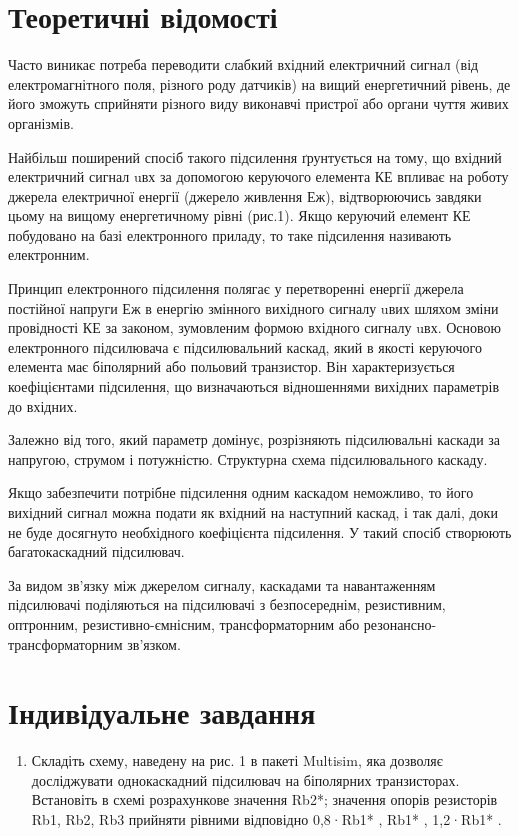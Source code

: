 \documentclass{article}
\begin{document}
\begin{normalsize}
	\section*{Теоретичні відомості}
	Часто виникає потреба переводити слабкий вхідний електричний сигнал (від електромагнітного поля, різного роду датчиків) на вищий енергетичний рівень, де його зможуть сприйняти різного виду виконавчі пристрої або органи чуття живих організмів. 
	
	Найбільш поширений спосіб такого підсилення ґрунтується на тому, що вхідний електричний сигнал uвх за допомогою керуючого елемента КЕ впливає на роботу джерела електричної енергії (джерело живлення Еж), відтворюючись завдяки цьому на вищому енергетичному рівні (рис.1). Якщо керуючий елемент КЕ побудовано на базі електронного приладу, то таке підсилення називають електронним. 
	
	Принцип електронного підсилення полягає у перетворенні енергії джерела постійної напруги Еж в енергію змінного вихідного сигналу uвих шляхом зміни провідності КЕ за законом, зумовленим формою вхідного сигналу uвх. Основою електронного підсилювача є підсилювальний каскад, який в якості керуючого елемента має біполярний або польовий транзистор. Він характеризується коефіцієнтами підсилення, що визначаються відношеннями вихідних параметрів до вхідних.

	Залежно від того, який параметр домінує, розрізняють підсилювальні каскади за напругою, струмом і потужністю. Структурна схема підсилювального каскаду.
	
	Якщо забезпечити потрібне підсилення одним каскадом неможливо, то його вихідний сигнал можна подати як вхідний на наступний каскад, і так далі, доки не буде досягнуто необхідного коефіцієнта підсилення. У такий спосіб створюють багатокаскадний підсилювач.
	
	За видом зв’язку між джерелом сигналу, каскадами та навантаженням підсилювачі поділяються на підсилювачі з безпосереднім, резистивним, оптронним, резистивно-ємнісним, трансформаторним або резонансно-трансформаторним зв’язком.
	
	\section*{Індивідуальне завдання}
	\begin{enumerate}
		\item Складіть схему, наведену на рис. 1 в пакеті Multisim, яка дозволяє досліджувати однокаскадний підсилювач на біполярних транзисторах. Встановіть в схемі розрахункове значення Rb2*; значення опорів резисторів Rb1, Rb2, Rb3 прийняти рівними відповідно 0,8·Rb1* , Rb1* , 1,2·Rb1* .
		

\end{enumerate}
\end{normalsize}
\end{document}
